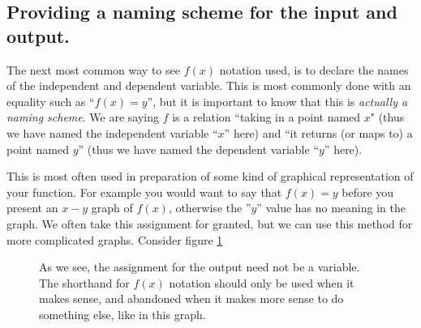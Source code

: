 \documentclass{ximera}
\begin{document}
        \subsection*{Providing a naming scheme for the input and output.}
        The next most common way to see $f(x)$ notation used, is to declare the names of the independent and dependent variable. This is most commonly done with an equality such as ``$f(x) = y$'', but it is important to know that this is \textit{actually a naming scheme}. We are saying $f$ is a relation ``taking in a point named $x$" (thus we have named the independent variable ``$x$'' here) and ``it returns (or maps to) a point named $y$'' (thus we have named the dependent variable ``$y$'' here). 
        
        This is most often used in preparation of some kind of graphical representation of your function. For example you would want to say that $f(x) = y$ before you present an $x-y$ graph of $f(x)$, otherwise the ''$y$'' value has no meaning in the graph. We often take this assignment for granted, but we can use this method for more complicated graphs. Consider figure \ref{profitProjections}
        
        \begin{figure}[h]
            \begin{center}
            \end{center}
            \caption{
                As we see, the assignment for the output need not be a variable. The shorthand for $f(x)$ notation should only be used when it makes sense, and abandoned when it makes more sense to do something else, like in this graph.
            }
            \label{profitProjections}
        \end{figure}
            
\end{document}
